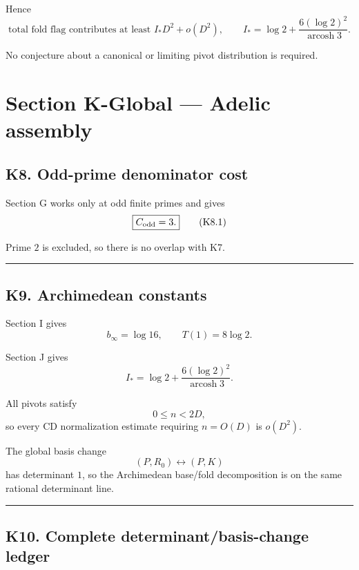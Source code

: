 \documentclass[
  10pt,
  letterpaper,
]{article}
\theoremstyle{definition}
\theoremstyle{remark}
\begin{document}
Hence \[
\boxed{
\text{total fold flag contributes at least }
I_*D^2+o(D^2),
\qquad
I_*=\log2+
\frac{6(\log2)^2}{\operatorname{arcosh}3}.
}
\]

No conjecture about a canonical or limiting pivot distribution is
required.

\section{Section K-Global --- Adelic
assembly}\label{section-k-global-adelic-assembly}

\subsection{K8. Odd-prime denominator
cost}\label{k8.-odd-prime-denominator-cost}

Section G works only at odd finite primes and gives \[
\boxed{
C_{\rm odd}=3.
}
\tag{K8.1}
\]

Prime \(2\) is excluded, so there is no overlap with K7.

\begin{center}\rule{0.5\linewidth}{0.5pt}\end{center}

\subsection{K9. Archimedean constants}\label{k9.-archimedean-constants}

Section I gives \[
\boxed{
b_\infty=\log16,
\qquad
T(1)=8\log2.
}
\tag{K9.1}
\]

Section J gives \[
\boxed{
I_*
=
\log2+
\frac{6(\log2)^2}{\operatorname{arcosh}3}.
}
\tag{K9.2}
\]

All pivots satisfy \[
0\le n<2D,
\] so every CD normalization estimate requiring \(n=O(D)\) is
\(o(D^2)\).

The global basis change \[
(P,R_0)\longleftrightarrow(P,K)
\] has determinant \(1\), so the Archimedean base/fold decomposition is
on the same rational determinant line.

\begin{center}\rule{0.5\linewidth}{0.5pt}\end{center}

\subsection{K10. Complete determinant/basis-change
ledger}\label{k10.-complete-determinantbasis-change-ledger}
\end{document}
